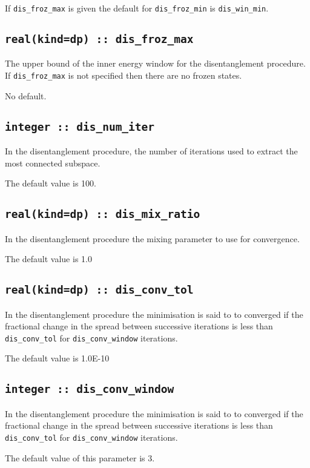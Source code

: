 If \verb#dis_froz_max# is given the default for 
\verb#dis_froz_min# is \verb#dis_win_min#.


\subsection[dis\_froz\_max]{\tt real(kind=dp) :: dis\_froz\_max}
The upper bound of the inner energy window for the disentanglement
procedure. If \verb#dis_froz_max# is  not specified then 
there are no frozen states.

No default.

\subsection[dis\_num\_iter]{\tt integer :: dis\_num\_iter}
In the disentanglement procedure, the
number of iterations used to extract the most connected subspace.

The default value is 100.

\subsection[dis\_mix\_ratio]{\tt real(kind=dp) :: dis\_mix\_ratio}
In the disentanglement procedure the mixing parameter to use for
convergence.

The default value is 1.0

\subsection[dis\_conv\_tol]{\tt real(kind=dp) :: dis\_conv\_tol}

In the disentanglement procedure the minimisation is said to to converged
if the fractional change in the spread between successive
iterations is less than
\verb#dis_conv_tol# for \verb#dis_conv_window# iterations.

The default value is 1.0E-10


\subsection[dis\_conv\_window]{\tt integer :: dis\_conv\_window}

In the disentanglement procedure the minimisation is said to to converged
if the fractional change in the spread between successive
iterations is less than
\verb#dis_conv_tol# for \verb#dis_conv_window# iterations.

The default value of this parameter is 3.




